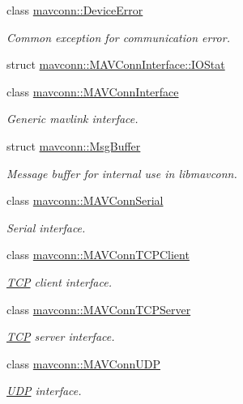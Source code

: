 \begin{DoxyCompactItemize}
\item 
class \mbox{\hyperlink{classmavconn_1_1DeviceError}{mavconn\+::\+Device\+Error}}
\begin{DoxyCompactList}\small\item\em Common exception for communication error. \end{DoxyCompactList}\item 
struct \mbox{\hyperlink{structmavconn_1_1MAVConnInterface_1_1IOStat}{mavconn\+::\+M\+A\+V\+Conn\+Interface\+::\+I\+O\+Stat}}
\item 
class \mbox{\hyperlink{classmavconn_1_1MAVConnInterface}{mavconn\+::\+M\+A\+V\+Conn\+Interface}}
\begin{DoxyCompactList}\small\item\em Generic mavlink interface. \end{DoxyCompactList}\item 
struct \mbox{\hyperlink{structmavconn_1_1MsgBuffer}{mavconn\+::\+Msg\+Buffer}}
\begin{DoxyCompactList}\small\item\em Message buffer for internal use in libmavconn. \end{DoxyCompactList}\item 
class \mbox{\hyperlink{classmavconn_1_1MAVConnSerial}{mavconn\+::\+M\+A\+V\+Conn\+Serial}}
\begin{DoxyCompactList}\small\item\em Serial interface. \end{DoxyCompactList}\item 
class \mbox{\hyperlink{classmavconn_1_1MAVConnTCPClient}{mavconn\+::\+M\+A\+V\+Conn\+T\+C\+P\+Client}}
\begin{DoxyCompactList}\small\item\em \mbox{\hyperlink{classTCP}{T\+CP}} client interface. \end{DoxyCompactList}\item 
class \mbox{\hyperlink{classmavconn_1_1MAVConnTCPServer}{mavconn\+::\+M\+A\+V\+Conn\+T\+C\+P\+Server}}
\begin{DoxyCompactList}\small\item\em \mbox{\hyperlink{classTCP}{T\+CP}} server interface. \end{DoxyCompactList}\item 
class \mbox{\hyperlink{classmavconn_1_1MAVConnUDP}{mavconn\+::\+M\+A\+V\+Conn\+U\+DP}}
\begin{DoxyCompactList}\small\item\em \mbox{\hyperlink{classUDP}{U\+DP}} interface. \end{DoxyCompactList}\end{DoxyCompactItemize}
